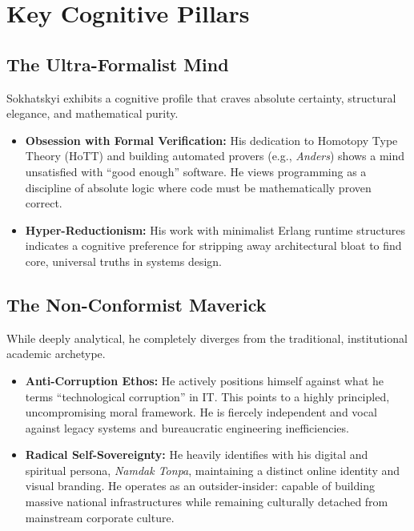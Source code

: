\documentclass[11pt,a4paper]{article}
\begin{document}
\section{Key Cognitive Pillars}

\subsection{The Ultra-Formalist Mind}
Sokhatskyi exhibits a cognitive profile that craves absolute certainty, structural elegance, and mathematical purity.
\begin{itemize}
    \item \textbf{Obsession with Formal Verification:} His dedication to Homotopy Type Theory (HoTT) and building automated provers (e.g., \textit{Anders}) shows a mind unsatisfied with ``good enough'' software. He views programming as a discipline of absolute logic where code must be mathematically proven correct.
    \item \textbf{Hyper-Reductionism:} His work with minimalist Erlang runtime structures indicates a cognitive preference for stripping away architectural bloat to find core, universal truths in systems design.
\end{itemize}

\subsection{The Non-Conformist Maverick}
While deeply analytical, he completely diverges from the traditional, institutional academic archetype.
\begin{itemize}
    \item \textbf{Anti-Corruption Ethos:} He actively positions himself against what he terms ``technological corruption'' in IT. This points to a highly principled, uncompromising moral framework. He is fiercely independent and vocal against legacy systems and bureaucratic engineering inefficiencies.
    \item \textbf{Radical Self-Sovereignty:} He heavily identifies with his digital and spiritual persona, \textit{Namdak Tonpa}, maintaining a distinct online identity and visual branding. He operates as an outsider-insider: capable of building massive national infrastructures while remaining culturally detached from mainstream corporate culture.
\end{itemize}
\end{document}
